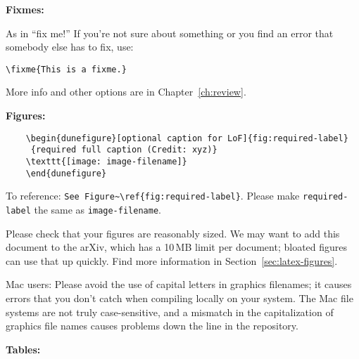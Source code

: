 \textbf{Fixmes:}

\begin{framed}
As in ``fix me!'' If you're not sure about something or you find an error that somebody else has to fix, use:
\begin{verbatim}
\fixme{This is a fixme.}
\end{verbatim}
More info and other options are in Chapter~\ref{ch:review}.
\end{framed}

\textbf{Figures:}

\begin{framed}
\begin{verbatim}
    \begin{dunefigure}[optional caption for LoF]{fig:required-label}
     {required full caption (Credit: xyz)}
    \texttt{[image: image-filename]}
    \end{dunefigure}
\end{verbatim}
To reference: \verb|See Figure~\ref{fig:required-label}|.
Please make \verb|required-label| the same as \verb|image-filename|. 

Please check that your figures are reasonably sized. We may want to add this document to the arXiv, which has a 10\,MB limit per document; bloated figures can use that up quickly. Find more information in Section~\ref{sec:latex-figures}.

Mac users: Please avoid the use of capital letters in graphics filenames; it causes errors that you don't catch when compiling locally on your system. The Mac file systems are not truly case-sensitive, and a mismatch in the capitalization of graphics file names causes problems down the line in the repository.
\end{framed}

\textbf{Tables:}

